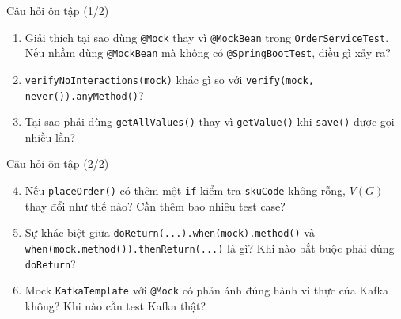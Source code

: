 \documentclass[aspectratio=169,10pt]{beamer}
\begin{document}
\begin{frame}{Câu hỏi ôn tập (1/2)}
  \begin{enumerate}
    \item Giải thích tại sao dùng \texttt{@Mock} thay vì \texttt{@MockBean}
      trong \texttt{OrderServiceTest}.
      Nếu nhầm dùng \texttt{@MockBean} mà không có \texttt{@SpringBootTest},
      điều gì xảy ra?

    \item \texttt{verifyNoInteractions(mock)} khác gì so với
      \texttt{verify(mock, never()).anyMethod()}?

    \item Tại sao phải dùng \texttt{getAllValues()} thay vì \texttt{getValue()}
      khi \texttt{save()} được gọi nhiều lần?
  \end{enumerate}
\end{frame}

\begin{frame}{Câu hỏi ôn tập (2/2)}
  \begin{enumerate}
    \setcounter{enumi}{3}
    \item Nếu \texttt{placeOrder()} có thêm một \texttt{if} kiểm tra
      \texttt{skuCode} không rỗng, $V(G)$ thay đổi như thế nào?
      Cần thêm bao nhiêu test case?

    \item Sự khác biệt giữa \texttt{doReturn(...).when(mock).method()}
      và \texttt{when(mock.method()).thenReturn(...)} là gì?
      Khi nào bắt buộc phải dùng \texttt{doReturn}?

    \item Mock \texttt{KafkaTemplate} với \texttt{@Mock} có phản ánh đúng
      hành vi thực của Kafka không? Khi nào cần test Kafka thật?
  \end{enumerate}
\end{frame}
\end{document}
